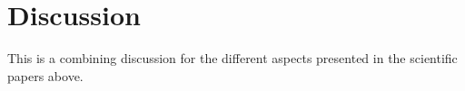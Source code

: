 \chapter{Discussion}
\label{chp:Discussion}

This is a combining discussion for the different aspects presented in the scientific papers above.